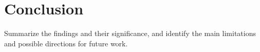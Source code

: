 \section{Conclusion}
Summarize the findings and their significance, and identify the main
limitations and possible directions for future work.
